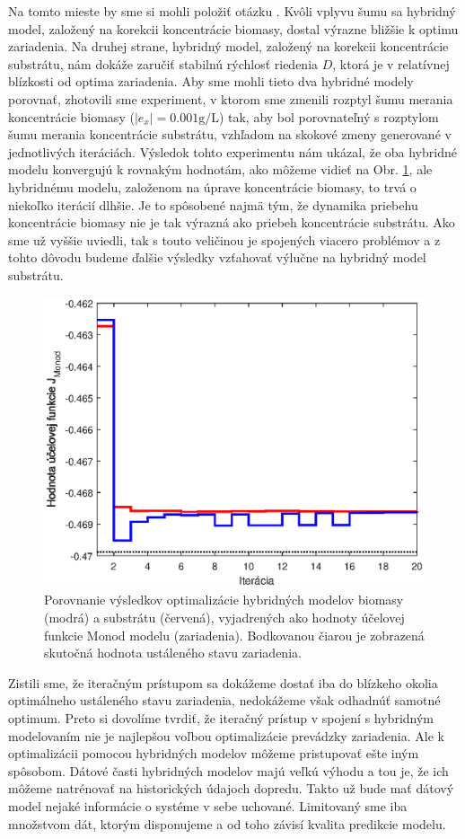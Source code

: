 Na tomto mieste by sme si mohli položiť otázku . Kvôli vplyvu šumu sa hybridný model, založený na korekcii koncentrácie biomasy, dostal výrazne bližšie k optimu zariadenia. Na druhej strane, hybridný model, založený na korekcii koncentrácie substrátu, nám dokáže zaručiť stabilnú rýchlosť riedenia $ D $, ktorá je v relatívnej blízkosti od optima zariadenia. Aby sme mohli tieto dva hybridné modely porovnať, zhotovili sme experiment, v ktorom sme zmenili rozptyl šumu merania koncentrácie biomasy ($ \left|e_{x}\right| = 0.001\si{\gram\per\liter} $) tak, aby bol porovnateľný s rozptylom šumu merania koncentrácie substrátu, vzhľadom na skokové zmeny generované v jednotlivých iteráciách. Výsledok tohto experimentu nám ukázal, že oba hybridné modelu konvergujú k rovnakým hodnotám, ako môžeme vidieť na Obr. \ref{fig:hybrid_sub_and_bio_compar}, ale hybridnému modelu, založenom na úprave koncentrácie biomasy, to trvá o niekoľko iterácií dlhšie. Je to spôsobené najmä tým, že dynamika priebehu koncentrácie biomasy nie je tak výrazná ako priebeh koncentrácie substrátu. Ako sme už vyššie uviedli, tak s touto veličinou je spojených viacero problémov a z tohto dôvodu budeme ďalšie výsledky vzťahovať výlučne na hybridný model substrátu. 
\begin{figure}
	\centering
	\includegraphics[width=0.7\linewidth]{images/hybrid_sub_and_bio_compar}
	\caption{Porovnanie výsledkov optimalizácie hybridných modelov biomasy (modrá) a substrátu (červená), vyjadrených ako hodnoty účelovej funkcie Monod modelu (zariadenia). Bodkovanou čiarou je zobrazená skutočná hodnota ustáleného stavu zariadenia.}
	\label{fig:hybrid_sub_and_bio_compar}
\end{figure}

Zistili sme, že iteračným prístupom sa dokážeme dostať iba do blízkeho okolia optimálneho ustáleného stavu zariadenia, nedokážeme však odhadnúť samotné optimum. Preto si dovolíme tvrdiť, že iteračný prístup v spojení s hybridným modelovaním nie je najlepšou voľbou optimalizácie prevádzky zariadenia. Ale k optimalizácii pomocou hybridných modelov môžeme pristupovať ešte iným spôsobom. Dátové časti hybridných modelov majú veľkú výhodu a tou je, že ich môžeme natrénovať na historických údajoch dopredu. Takto už bude mať dátový model nejaké informácie o systéme v sebe uchované. Limitovaný sme iba množstvom dát, ktorým disponujeme a od toho závisí kvalita predikcie modelu. 

